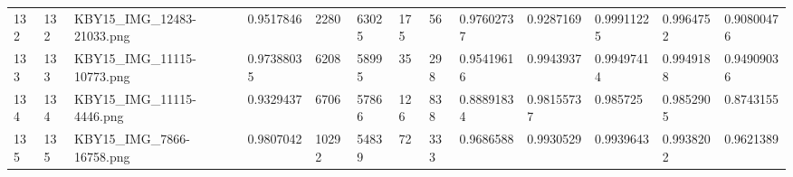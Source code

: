 \documentclass[11pt, a4paper, twoside]{report}
\begin{document}
\begin{longtable}[c]{@{}lllllllllllll@{}}
132 & 132 & KBY15\_IMG\_12483-21033.png & 0.9517846 & 2280 & 63025 & 175 & 56 & 0.97602737 & 0.9287169 & 0.99911225 & 0.9964752 & 0.90800476 \\
133 & 133 & KBY15\_IMG\_11115-10773.png & 0.97388035 & 6208 & 58995 & 35 & 298 & 0.95419616 & 0.9943937 & 0.99497414 & 0.9949188 & 0.94909036 \\
134 & 134 & KBY15\_IMG\_11115-4446.png & 0.9329437 & 6706 & 57866 & 126 & 838 & 0.88891834 & 0.98155737 & 0.985725 & 0.9852905 & 0.8743155 \\
135 & 135 & KBY15\_IMG\_7866-16758.png & 0.9807042 & 10292 & 54839 & 72 & 333 & 0.9686588 & 0.9930529 & 0.9939643 & 0.9938202 & 0.9621389 \\* \bottomrule
\end{longtable}

\newpage

\end{document}
